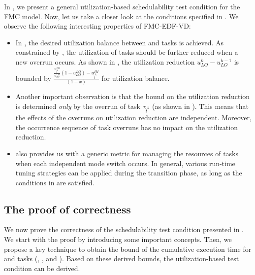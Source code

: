 \documentclass[10pt,journal,compsoc]{IEEEtran}
\begin{document}
In , we present a general utilization-based schedulability test condition for the FMC model. Now, let us take a closer look at the conditions specified in . We observe the following interesting properties of FMC-EDF-VD:
\begin{itemize}
\item In , the desired utilization balance between \lo and \hi tasks is achieved. As constrained by , the utilization of \lo tasks should be further reduced when a new overrun occurs. As shown in , the utilization reduction $u_{LO}^{k}-u_{LO}^{k-1}$ is bounded by $\frac{\frac{u_{\hat{t}^k}^{LO}}{u_{HI}^{LO}}(1-u_{LO}^{LO})-u_{\hat{t}^k}^{HI}}{(1-x)}$ for utilization balance.  
\item Another important observation is that the bound on the utilization reduction is determined \textit{only} by the overrun of \hi task $\tau_{\hat{t}^k}$ (as shown in ). This means that the effects of the overruns on utilization reduction are independent. 
Moreover, the occurrence sequence of \hi task overruns has no impact on the utilization reduction. %
\item {} also provides us with a generic metric for managing the resources of \lo tasks when each independent mode switch occurs. In general, various run-time tuning strategies can be applied during the transition phase, as long as the conditions in  are satisfied. 
\end{itemize}

\subsection{The proof of correctness}
\label{sec:corr}
We now prove the correctness of the schedulability test condition presented in . We start with the proof by introducing some important concepts. Then, we propose a key technique to obtain the bound of the cumulative execution time for \lo and \hi tasks (, , and ). Based on these derived bounds, the utilization-based test condition can be derived.
\end{document}
